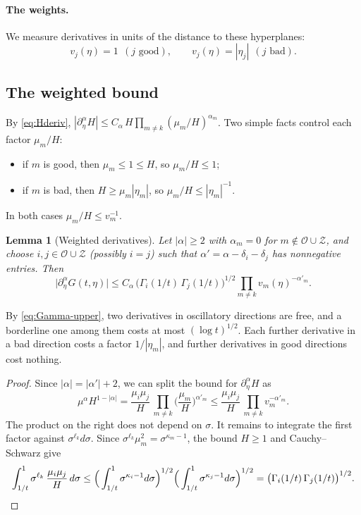 \documentclass[11pt]{article}
\newtheorem{lemma}[theorem]{Lemma}
\theoremstyle{remark}
\begin{document}
\paragraph{The weights.} We measure derivatives in units of the distance to these
hyperplanes:
\[
v_j(\eta)=1\ \ (j\text{ good}),\qquad v_j(\eta)=|\eta_j|\ \ (j\text{ bad}).
\]

\subsection{The weighted bound}

By \eqref{eq:Hderiv},
$|\partial_\eta^\alpha H|\le C_\alpha\,H\prod_{m\ne k}(\mu_m/H)^{\alpha_m}$. Two simple
facts control each factor $\mu_m/H$:
\begin{itemize}
	\item if $m$ is good, then $\mu_m\le1\le H$, so $\mu_m/H\le1$;
	\item if $m$ is bad, then $H\ge\mu_m|\eta_m|$, so $\mu_m/H\le|\eta_m|^{-1}$.
\end{itemize}
In both cases $\mu_m/H\le v_m^{-1}$.

\begin{lemma}[Weighted derivatives]\label{lem:weighted}
	Let $|\alpha|\ge2$ with $\alpha_m=0$ for $m\notin\mathcal O\cup\mathcal Z$, and
	choose $i,j\in\mathcal O\cup\mathcal Z$ (possibly $i=j$) such that
	$\alpha'=\alpha-\delta_i-\delta_j$ has nonnegative entries. Then
	\[
	\big|\partial_\eta^\alpha G(t,\eta)\big|\le C_\alpha\,\big(\Gamma_i(1/t)\,\Gamma_j(1/t)\big)^{1/2}
	\prod_{m\ne k}v_m(\eta)^{-\alpha'_m}.
	\]
\end{lemma}

By \eqref{eq:Gamma-upper}, two derivatives in oscillatory directions are free, and a
borderline one among them costs at most $(\log t)^{1/2}$. Each further derivative in
a bad direction costs a factor $1/|\eta_m|$, and further derivatives in good
directions cost nothing.

\begin{proof}
	Since $|\alpha|=|\alpha'|+2$, we can split the bound for $\partial_\eta^\alpha H$ as
	\[
	\mu^\alpha H^{1-|\alpha|}=\frac{\mu_i\mu_j}{H}\,\prod_{m\ne k}\Big(\frac{\mu_m}{H}\Big)^{\alpha'_m}
	\le\frac{\mu_i\mu_j}{H}\,\prod_{m\ne k}v_m^{-\alpha'_m}.
	\]
	The product on the right does not depend on $\sigma$. It remains to integrate the
	first factor against $\sigma^{\ell_k}d\sigma$. Since $\sigma^{\ell_k}\mu_m^2
	=\sigma^{\kappa_m-1}$, the bound $H\ge1$ and Cauchy--Schwarz give
	\[
	\int_{1/t}^1\sigma^{\ell_k}\,\frac{\mu_i\mu_j}{H}\,d\sigma
	\le\Big(\int_{1/t}^1\sigma^{\kappa_i-1}d\sigma\Big)^{1/2}
	\Big(\int_{1/t}^1\sigma^{\kappa_j-1}d\sigma\Big)^{1/2}
	=\big(\Gamma_i(1/t)\,\Gamma_j(1/t)\big)^{1/2}. \qedhere
	\]
\end{proof}
\end{document}
